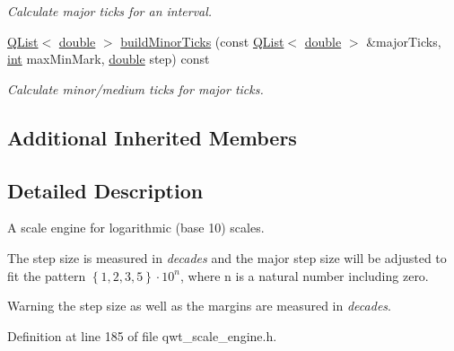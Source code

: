 \begin{DoxyCompactItemize}
\begin{DoxyCompactList}\small\item\em Calculate major ticks for an interval. \end{DoxyCompactList}\item 
\hyperlink{class_q_list}{Q\-List}$<$ \hyperlink{_super_l_u_support_8h_a8956b2b9f49bf918deed98379d159ca7}{double} $>$ \hyperlink{class_qwt_log10_scale_engine_af848f0d01723fe3696da0d6b453d1443}{build\-Minor\-Ticks} (const \hyperlink{class_q_list}{Q\-List}$<$ \hyperlink{_super_l_u_support_8h_a8956b2b9f49bf918deed98379d159ca7}{double} $>$ \&major\-Ticks, \hyperlink{ioapi_8h_a787fa3cf048117ba7123753c1e74fcd6}{int} max\-Min\-Mark, \hyperlink{_super_l_u_support_8h_a8956b2b9f49bf918deed98379d159ca7}{double} step) const 
\begin{DoxyCompactList}\small\item\em Calculate minor/medium ticks for major ticks. \end{DoxyCompactList}\end{DoxyCompactItemize}
\subsection*{Additional Inherited Members}


\subsection{Detailed Description}
A scale engine for logarithmic (base 10) scales. 

The step size is measured in {\itshape decades} and the major step size will be adjusted to fit the pattern $\left\{ 1,2,3,5\right\} \cdot 10^{n}$, where n is a natural number including zero.

\begin{DoxyWarning}{Warning}
the step size as well as the margins are measured in {\itshape decades}. 
\end{DoxyWarning}


Definition at line 185 of file qwt\-\_\-scale\-\_\-engine.\-h.



